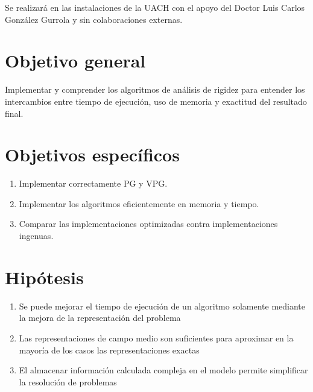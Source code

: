 Se realizará en las instalaciones de la UACH con el apoyo del Doctor Luis Carlos González Gurrola y sin colaboraciones externas.

\section{Objetivo general}
Implementar y comprender los algoritmos de análisis de rigidez para entender los intercambios entre tiempo de ejecución, uso de memoria y exactitud del resultado final.

\section{Objetivos específicos}
\begin{enumerate}
  \item Implementar correctamente PG y VPG.
  \item Implementar los algoritmos eficientemente en memoria y tiempo.
  \item Comparar las implementaciones optimizadas contra implementaciones ingenuas.
\end{enumerate}

\section{Hipótesis}
\begin{enumerate}
	\item Se puede mejorar el tiempo de ejecución de un algoritmo solamente mediante la mejora de la representación del problema
	\item Las representaciones de campo medio son suficientes para aproximar en la mayoría de los casos las representaciones exactas
	\item El almacenar información calculada compleja en el modelo permite simplificar la resolución de problemas
\end{enumerate}